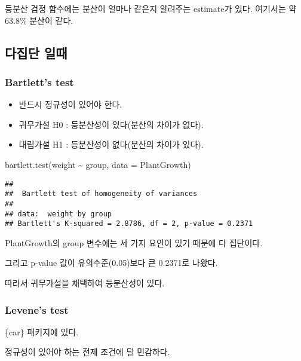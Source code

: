 \documentclass[
]{article}
\newenvironment{Shaded}{\begin{snugshade}}{\end{snugshade}}
\newcommand{\AttributeTok}[1]{\textcolor[rgb]{0.77,0.63,0.00}{#1}}
\newcommand{\FunctionTok}[1]{\textcolor[rgb]{0.00,0.00,0.00}{#1}}
\newcommand{\NormalTok}[1]{#1}
\newcommand{\SpecialCharTok}[1]{\textcolor[rgb]{0.00,0.00,0.00}{#1}}
\begin{document}
등분산 검정 함수에는 분산이 얼마나 같은지 알려주는 estimate가 있다.
여기서는 약 63.8\% 분산이 같다.

\hypertarget{uxb2e4uxc9d1uxb2e8-uxc77cuxb54c}{%
\subsection{다집단 일때}\label{uxb2e4uxc9d1uxb2e8-uxc77cuxb54c}}

\hypertarget{bartletts-test}{%
\subsubsection{Bartlett's test}\label{bartletts-test}}

\begin{itemize}
\item
  반드시 정규성이 있어야 한다.
\item
  귀무가설 H0 : 등분산성이 있다(분산의 차이가 없다).
\item
  대립가설 H1 : 등분산성이 없다(분산의 차이가 있다).
\end{itemize}

\begin{Shaded}
\begin{Highlighting}[]
\FunctionTok{bartlett.test}\NormalTok{(weight }\SpecialCharTok{\textasciitilde{}}\NormalTok{ group, }\AttributeTok{data =}\NormalTok{ PlantGrowth)}
\end{Highlighting}
\end{Shaded}

\begin{verbatim}
## 
##  Bartlett test of homogeneity of variances
## 
## data:  weight by group
## Bartlett's K-squared = 2.8786, df = 2, p-value = 0.2371
\end{verbatim}

PlantGrowth의 group 변수에는 세 가지 요인이 있기 때문에 다 집단이다.

그리고 p-value 값이 유의수준(0.05)보다 큰 0.2371로 나왔다.

따라서 귀무가설을 채택하여 등분산성이 있다.

\hypertarget{levenes-test}{%
\subsubsection{Levene's test}\label{levenes-test}}

\{car\} 패키지에 있다.

정규성이 있어야 하는 전제 조건에 덜 민감하다.
\end{document}
